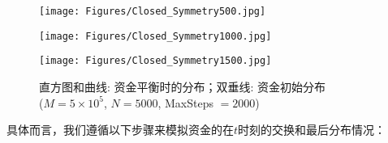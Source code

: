\documentclass[tsinghuacite]{HustGraduPaper}
\begin{document}
			
			
			\begin{figure}[htbp]
			\centering                                                 

			\begin{minipage}[t]{0.49\textwidth}                                                      
			\texttt{[image: Figures/Closed\_Symmetry500.jpg]}               
			\end{minipage}
			\begin{minipage}[t]{0.49\textwidth}                 
			\texttt{[image: Figures/Closed\_Symmetry1000.jpg]}               
			\end{minipage}
			
			\begin{minipage}[t]{0.49\textwidth}                 
			\texttt{[image: Figures/Closed\_Symmetry1500.jpg]}               
			\end{minipage}

			\caption{直方图和曲线: 资金平衡时的分布；双垂线: 资金初始分布 \\ ($M = 5 \times 10^5$, $N = 5000$, MaxSteps $= 2000$)} 
			\label{fig:Closed_Symmetry}                                                        
			\end{figure}

		
			具体而言，我们遵循以下步骤来模拟资金的在$t$时刻的交换和最后分布情况： 
			
\end{document}

